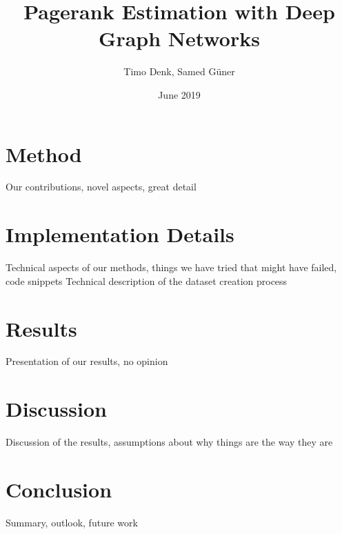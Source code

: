 \documentclass{article}
\title{Pagerank Estimation with Deep Graph Networks}
\author{Timo Denk, Samed Güner}
\date{June 2019}
\begin{document}
\maketitle

\tableofcontents
\listoffigures






\section{Method}
Our contributions, novel aspects, great detail



\section{Implementation Details}
Technical aspects of our methods, things we have tried that might have failed, code snippets
Technical description of the dataset creation process


\section{Results}
Presentation of our results, no opinion

\section{Discussion}
Discussion of the results, assumptions about why things are the way they are

\section{Conclusion}
Summary, outlook, future work

\printbibliography
{}
\label{sec:references}
\end{document}
